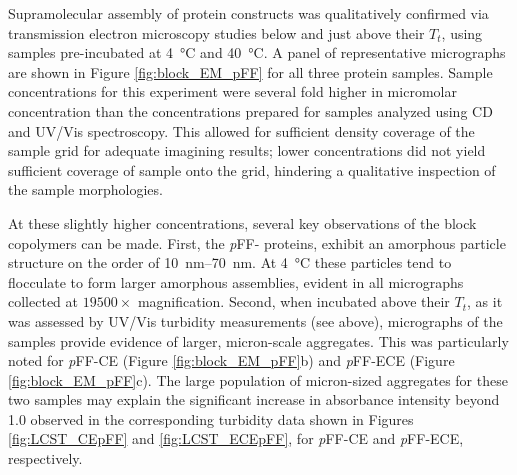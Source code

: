\begin{refsection}
Supramolecular assembly of protein constructs was qualitatively confirmed via
transmission electron microscopy studies below and just above their ${T_t}$,
using samples pre-incubated at \SI{4}{\celsius} and \SI{40}{\celsius}.  A panel
of representative micrographs are shown in Figure \ref{fig:block_EM_pFF} for all
three protein samples. Sample concentrations for this experiment were several
fold higher in micromolar concentration than the concentrations prepared for
samples analyzed using CD and UV/Vis spectroscopy.  This allowed for sufficient
density coverage of the sample grid for adequate imagining results; lower
concentrations did not yield sufficient coverage of sample onto the grid,
hindering a qualitative inspection of the sample morphologies.

At these slightly higher concentrations, several key observations of the block
copolymers can be made. First, the \emph{p}FF- proteins, exhibit an amorphous
particle structure on the order of \SIrange{10}{70}{\nm}. At
\SI{4}{\celsius} these particles tend to flocculate to form larger amorphous
assemblies, evident in all micrographs collected at ${19500 \times}$
magnification. Second, when incubated above their ${T_t}$, as it was assessed by
UV/Vis turbidity measurements (see above), micrographs of the samples provide
evidence of larger, micron-scale aggregates. This was particularly noted for
\emph{p}FF-CE (Figure \ref{fig:block_EM_pFF}b) and \emph{p}FF-ECE (Figure
\ref{fig:block_EM_pFF}c). The large population of micron-sized aggregates for
these two samples may explain the significant increase in absorbance intensity
beyond \SI{1.0}{\AU} observed in the corresponding turbidity data shown in Figures
\ref{fig:LCST_CEpFF} and \ref{fig:LCST_ECEpFF}, for \emph{p}FF-CE and
\emph{p}FF-ECE, respectively.


\end{refsection}
